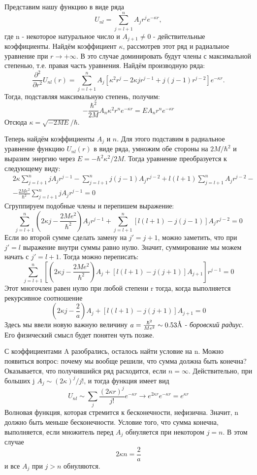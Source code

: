 Представим нашу функцию в виде ряда 
\[
U_{nl} = \sum\limits_{j=l+1}^{n}A_j r^j e^{-\kappa r},
\]
где n - некоторое натуральное число и $A_{j+1} \neq 0$ - действительные коэффициенты. Найдём коэффициент $\kappa$, рассмотрев этот ряд и радиальное уравнение при $r \rightarrow +\infty$. В это случае доминировать будут члены с максимальной степенью, т.е. правая часть уравнения. Найдём производную ряда:
\[
\frac{\partial^2}{\partial r^2} U_{nl}(r) =  \sum\limits_{j=l+1}^{n} A_j[\kappa^2r^j - 2\kappa jr^{j-1} + j(j-1)r^{j-2}]e^{-\kappa r}.
\]
Тогда, подставляя максимальную степень, получим:
\[
 -\frac{\hbar^2}{2M}A_n\kappa^2r^n e^{-\kappa r} = EA_n r^n e^{-\kappa r}
\]
Отсюда $\kappa = \sqrt{-2ME}/\hbar$.

Теперь найдём коэффициенты $A_j$ и $n$. Для этого подставим в радиальное уравнение функцию $U_{nl}(r)$ в виде ряда, умножим обе стороны на $2M/\hbar^2$ и выразим энергию через $E = -\hbar^2\kappa^2/2M$. Тогда уравнение преобразуется к следующему виду:
\begin{align*}
    &2\kappa\sum\limits_{j = l+1}^n jA_j r^{j-1} - \sum\limits_{j = l+1}^n j(j-1)A_j r^{j-2} + l(l+1)\sum\limits_{j = l+1}^n A_j r^{j-2} - \\
    & - \frac{2Me^2}{\hbar^2}\sum\limits_{j = l+1}^n jA_j r^{j-1} =0
\end{align*}
Сгруппируем подобные члены и перепишем выражение:
\[
\sum\limits_{j = l+1}^n\left(2\kappa j - \frac{2Me^2}{\hbar^2}\right)A_j r^{j-1} + \sum\limits_{j = l+1}^n [l(l+1) - j(j-1)] A_j r^{j-2} =0
\]
Если во второй сумме сделать замену на $j' = j + 1$, можно заметить, что при $j'=l$ выражение внутри суммы равно нулю. Значит, суммирование мы можем начать с $j'= l+ 1$. Тогда можно переписать:
\[
\sum\limits_{j = l+1}^n\left[\left(2\kappa j - \frac{2Me^2}{\hbar^2}\right)A_j+ [l(l+1) - j(j+1)] A_{j+1} \right]r^{j-1} = 0
\]
Этот многочлен равен нулю при любой степени r тогда, когда выполняется рекурсивное соотношение
\[
\left(2\kappa j - \frac{2}{a}\right)A_j+ [l(l+1) - j(j+1)] A_{j+1} = 0
\]
Здесь мы ввели новую важную величину $a = \frac{\hbar^2}{Me^2} \sim 0.53 \text{\r{A}}$ - \textit{боровский радиус}. Его физический смысл будет понятен чуть позже.

С коэффициентами A разобрались, осталось найти условие на n. Можно появиться вопрос: почему мы вообще решили, что сумма должна быть конечна? Оказывается, что получившийся ряд расходится, если $n=\infty$. Действительно, при больших j $A_j \sim (2\kappa)^j/j!$, и тогда функция имеет вид
\[
U_{nl} \sim \sum\limits_j\frac{(2\kappa r)^j}{j!}e^{-\kappa r} \rightarrow e^{2\kappa r}e^{-\kappa r} = e^{\kappa r}
\]
Волновая функция, которая стремится к бесконечности, нефизична. Значит, n должно быть меньше бесконечности. Условие того, что сумма конечна, выполняется, если множитель перед $A_j$ обнуляется при некотором $j = n$. В этом случае
\[
2\kappa n = \frac{2}{a}
\]
и все $A_j$ при $j > n$ обнуляются.

